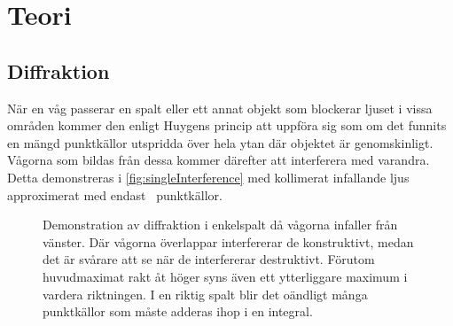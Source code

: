 \documentclass[a4paper]{article}
\begin{document}
\section{Teori}

\subsection{Diffraktion}

\FloatBarrier


När en våg passerar en spalt eller ett annat objekt som blockerar ljuset i vissa områden kommer den enligt Huygens princip att uppföra sig som om det funnits en mängd punktkällor utspridda över hela ytan där objektet är genomskinligt. Vågorna som bildas från dessa kommer därefter att interferera med varandra. Detta demonstreras i \autoref{fig:singleInterference} med kollimerat infallande ljus approximerat med endast \numSources~punktkällor.

\begin{figure}[ht]
	\centering
	\caption{Demonstration av diffraktion i enkelspalt då vågorna infaller från vänster. Där vågorna överlappar interfererar de konstruktivt, medan det är svårare att se när de interfererar destruktivt. Förutom huvudmaximat rakt åt höger syns även ett ytterliggare maximum i vardera riktningen. I en riktig spalt blir det oändligt många punktkällor som måste adderas ihop i en integral.}
	\label{fig:singleInterference}
\end{figure}
\end{document}
